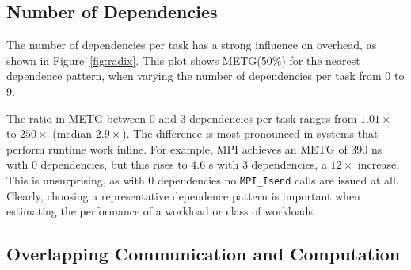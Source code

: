 \subsection{Number of Dependencies}
\label{subsec:number-of-dependencies}

The number of dependencies per task has a strong influence on
overhead, as shown in
Figure~\ref{fig:radix}. This plot shows METG(50\%) for the nearest
dependence pattern, when varying the number of dependencies per task
from 0 to 9.



The ratio in METG between 0 and 3 dependencies per task ranges from
$1.01\times$ to $250\times$ (median $2.9\times$). The difference is most pronounced in systems that
perform runtime work inline. For example, MPI achieves an METG of 390
ns with 0 dependencies, but this rises to 4.6 \textmu{}s with 3 dependencies,
a $12\times$ increase. This is unsurprising, as with
0 dependencies no \lstinline[language=C++]{MPI_Isend} calls are
issued at all. Clearly, choosing a representative dependence
pattern is important when estimating the performance of a workload or
class of workloads.




\subsection{Overlapping Communication and Computation}

